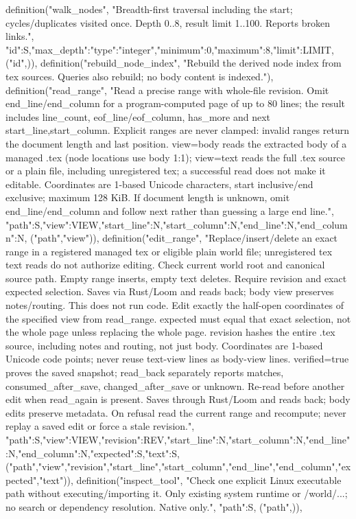     definition("walk_nodes", "Breadth-first traversal including the start; cycles/duplicates visited once. Depth 0..8, result limit 1..100. Reports broken links.", {"id":S,"max_depth":{"type":"integer","minimum":0,"maximum":8},"limit":LIMIT}, ("id",)),
    definition("rebuild_node_index", "Rebuild the derived node index from tex sources. Queries also rebuild; no body content is indexed."),
    definition("read_range", "Read a precise range with whole-file revision. Omit end_line/end_column for a program-computed page of up to 80 lines; the result includes line_count, eof_line/eof_column, has_more and next {start_line,start_column}. Explicit ranges are never clamped: invalid ranges return the document length and last position. view=body reads the extracted body of a managed .tex (node locations use body 1:1); view=text reads the full .tex source or a plain file, including unregistered tex; a successful read does not make it editable. Coordinates are 1-based Unicode characters, start inclusive/end exclusive; maximum 128 KiB. If document length is unknown, omit end_line/end_column and follow next rather than guessing a large end line.", {"path":S,"view":VIEW,"start_line":N,"start_column":N,"end_line":N,"end_column":N}, ("path","view")),
    definition("edit_range", "Replace/insert/delete an exact range in a registered managed tex or eligible plain world file; unregistered tex text reads do not authorize editing. Check current world root and canonical source path. Empty range inserts, empty text deletes. Require revision and exact expected selection. Saves via Rust/Loom and reads back; body view preserves notes/routing. This does not run code. Edit exactly the half-open coordinates of the specified view from read_range. expected must equal that exact selection, not the whole page unless replacing the whole page. revision hashes the entire .tex source, including notes and routing, not just body. Coordinates are 1-based Unicode code points; never reuse text-view lines as body-view lines. verified=true proves the saved snapshot; read_back separately reports matches, consumed_after_save, changed_after_save or unknown. Re-read before another edit when read_again is present. Saves through Rust/Loom and reads back; body edits preserve metadata. On refusal read the current range and recompute; never replay a saved edit or force a stale revision.", {"path":S,"view":VIEW,"revision":REV,"start_line":N,"start_column":N,"end_line":N,"end_column":N,"expected":S,"text":S}, ("path","view","revision","start_line","start_column","end_line","end_column","expected","text")),
    definition("inspect_tool", "Check one explicit Linux executable path without executing/importing it. Only existing system runtime or /world/...; no search or dependency resolution. Native only.", {"path":S}, ("path",)),
